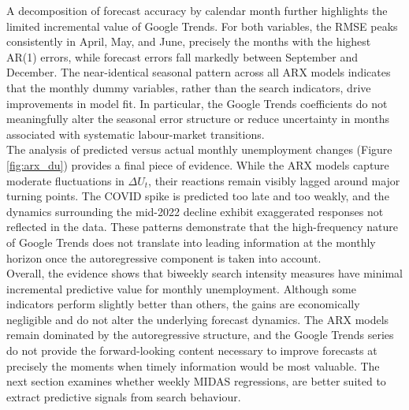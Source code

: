 \documentclass[12pt,a4paper]{article}
\begin{document}
A decomposition of forecast accuracy by calendar month further highlights the limited incremental value of Google Trends. For both variables, the RMSE peaks consistently in April, May, and June, precisely the months with the highest AR(1) errors, while forecast errors fall markedly between September and December. The near-identical seasonal pattern across all ARX models indicates that the monthly dummy variables, rather than the search indicators, drive improvements in model fit. In particular, the Google Trends coefficients do not meaningfully alter the seasonal error structure or reduce uncertainty in months associated with systematic labour-market transitions. \\
The analysis of predicted versus actual monthly unemployment changes (Figure \ref{fig:arx_du}) provides a final piece of evidence. While the ARX models capture moderate fluctuations in $\Delta U_t$, their reactions remain visibly lagged around major turning points. The COVID spike is predicted too late and too weakly, and the dynamics surrounding the mid-2022 decline exhibit exaggerated responses not reflected in the data. These patterns demonstrate that the high-frequency nature of Google Trends does not translate into leading information at the monthly horizon once the autoregressive component is taken into account.\\
Overall, the evidence shows that biweekly search intensity measures have minimal incremental predictive value for monthly unemployment. Although some indicators perform slightly better than others, the gains are economically negligible and do not alter the underlying forecast dynamics. The ARX models remain dominated by the autoregressive structure, and the Google Trends series do not provide the forward-looking content necessary to improve forecasts at precisely the moments when timely information would be most valuable. The next section examines whether weekly MIDAS regressions, are better suited to extract predictive signals from search behaviour.
\end{document}
